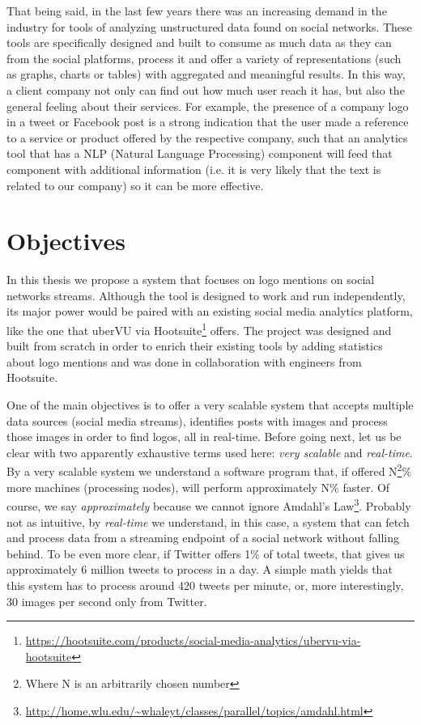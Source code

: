 That being said, in the last few years there was an increasing demand in the
industry for tools of analyzing unstructured data found on social networks.
These tools are specifically designed and built to consume as much data as they
can from the social platforms, process it and offer a variety of
representations (such as graphs, charts or tables) with aggregated and
meaningful results. In this way, a client company not only can find out how
much user reach it has, but also the general feeling about their services. For
example, the presence of a company logo in a tweet or Facebook post is a
strong indication that the user made a reference to a service or product
offered by the respective company, such that an analytics tool that has a
NLP (Natural Language Processing) component will feed that component with
additional information (i.e. it is very likely that the text is related to our
company) so it can be more effective.

\section{Objectives}

In this thesis we propose a system that focuses on logo mentions on social
networks streams. Although the tool is designed to work and run independently,
its major power would be paired with an existing social media analytics
platform, like the one that uberVU via
Hootsuite\footnote{\url{https://hootsuite.com/products/social-media-analytics/ubervu-via-hootsuite}}
offers. The project was designed and built from scratch in order to enrich
their existing tools by adding statistics about logo mentions and was done in
collaboration with engineers from Hootsuite.

One of the main objectives is to offer a very scalable system that accepts
multiple data sources (social media streams), identifies posts with images and
process those images in order to find logos, all in real-time. Before going
next, let us be clear with two apparently exhaustive terms used here:
\textit{very scalable} and \textit{real-time}. By a very scalable
system we understand a software program that, if offered
N\footnote{Where N is an arbitrarily chosen number}\% more
machines (processing nodes), will perform approximately N\% faster.
Of course, we say \textit{approximately} because we cannot ignore Amdahl's
Law\footnote{\url{http://home.wlu.edu/~whaleyt/classes/parallel/topics/amdahl.html}}.
Probably not as intuitive, by \textit{real-time} we understand, in this case, a
system that can fetch and process data from a streaming endpoint of a social
network without falling behind. To be even more clear, if Twitter offers
1\% of total tweets, that gives us approximately 6 million tweets to
process in a day. A simple math yields that this system has to process around
420 tweets per minute, or, more interestingly, 30 images per second only from
Twitter.

